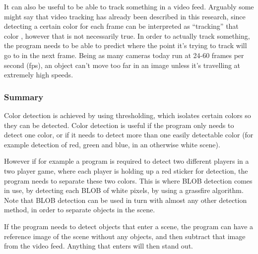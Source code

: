 It can also be useful to be able to track something in a video feed. Arguably some might say that video tracking has already been described in this research, since detecting a certain color for each frame can be interpreted as “tracking” that color \parencite{Moeslund2012}, however that is not necessarily true. In order to actually track something, the program needs to be able to predict where the point it’s trying to track will go to in the next frame. Being as many cameras today run at 24-60 frames per second (fps), an object can’t move too far in an image unless it’s travelling at extremely high speeds.

\subsubsection{Summary}
Color detection is achieved by using thresholding, which isolates certain colors so they can be detected. Color detection is useful if the program only needs to detect one color, or if it needs to detect more than one easily detectable color (for example detection of red, green and blue, in an otherwise white scene).

However if for example a program is required to detect two different players in a two player game, where each player is holding up a red sticker for detection, the program needs to separate these two colors. This is where BLOB detection comes in use, by detecting each BLOB of white pixels, by using a grassfire algorithm. Note that BLOB detection can be used in turn with almost any other detection method, in order to separate objects in the scene.

If the program needs to detect objects that enter a scene, the program can have a reference image of the scene without any objects, and then subtract that image from the video feed. Anything that enters will then stand out. \parencite{Moeslund2012}
